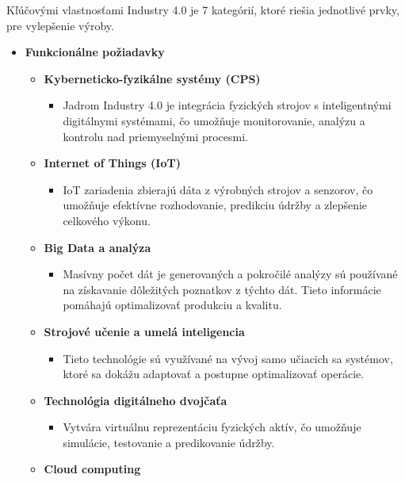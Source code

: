 Kľúčovými vlastnosťami Industry 4.0 je 7 kategórií, ktoré riešia jednotlivé prvky, pre vylepšenie výroby. 

\begin{itemize}
   \item \textbf{Funkcionálne požiadavky}
   
   \begin{itemize}
     \item \textbf{Kyberneticko-fyzikálne systémy (CPS)}
        \begin{itemize}
            \item Jadrom Industry 4.0 je integrácia fyzických strojov s inteligentnými digitálnymi systémami, čo umožňuje monitorovanie, analýzu a kontrolu nad priemyselnými procesmi.
        \end{itemize}
     \item \textbf{Internet of Things (IoT)}
        \begin{itemize}
            \item IoT zariadenia zbierajú dáta z výrobných strojov a senzorov, čo umožňuje efektívne rozhodovanie, predikciu údržby a zlepšenie celkového výkonu.
        \end{itemize}
     \item \textbf{Big Data a analýza}
        \begin{itemize}
            \item Masívny počet dát je generovaných a pokročilé analýzy sú používané na získavanie dôležitých poznatkov z týchto dát. Tieto informácie pomáhajú optimalizovať produkciu a kvalitu.
        \end{itemize}
     \item \textbf{Strojové učenie a umelá inteligencia}
        \begin{itemize}
            \item Tieto technológie sú využívané na vývoj samo učiacich sa systémov, ktoré sa dokážu adaptovať a postupne optimalizovať operácie.
        \end{itemize}
     \item \textbf{Technológia digitálneho dvojčaťa}
        \begin{itemize}
            \item Vytvára virtuálnu reprezentáciu fyzických aktív, čo umožňuje simulácie, testovanie a predikovanie údržby.
        \end{itemize}
     \item \textbf{Cloud computing}
        \begin{itemize}

\end{itemize}
\end{itemize}
\end{itemize}
